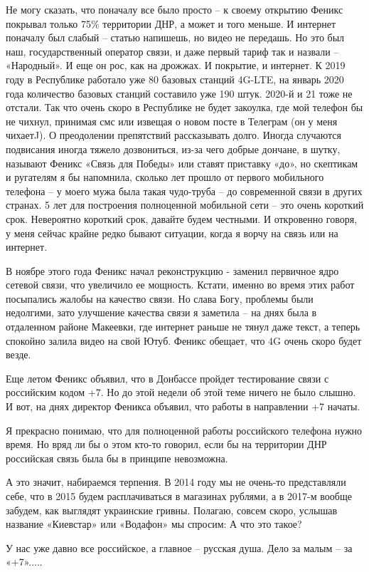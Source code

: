 Не могу сказать, что поначалу все было просто – к своему открытию Феникс
покрывал только 75\% территории ДНР, а может и того меньше. И интернет поначалу
был слабый – статью напишешь, но видео не передашь. Но это был наш,
государственный оператор связи, и даже первый тариф так и назвали – «Народный».
И еще он рос, как на дрожжах. И покрытие, и интернет. К 2019 году в Республике
работало уже 80 базовых станций 4G-LTE, на январь 2020 года количество базовых
станций составило уже 190 штук. 2020-й и 21 тоже не отстали. Так что очень
скоро в Республике не будет закоулка, где мой телефон бы не чихнул, принимая
смс или извещая о новом посте в Телеграм (он у меня чихаетJ). О преодолении
препятствий рассказывать долго. Иногда случаются подвисания иногда тяжело
дозвониться, из-за чего добрые дончане, в шутку, называют Феникс «Связь для
Победы» или ставят приставку «до», но скептикам и ругателям я бы напомнила,
сколько лет прошло от первого мобильного телефона – у моего мужа была такая
чудо-труба – до современной связи в других странах. 5 лет для построения
полноценной мобильной сети – это очень короткий срок. Невероятно короткий срок,
давайте будем честными. И откровенно говоря, у меня сейчас крайне редко бывают
ситуации, когда я ворчу на связь или на интернет.


В ноябре этого года Феникс начал реконструкцию - заменил первичное ядро сетевой
связи, что увеличило ее мощность. Кстати, именно во время этих работ посыпались
жалобы на качество связи. Но слава Богу, проблемы были недолгими, зато
улучшение качества связи я заметила – на днях была в отдаленном районе
Макеевки, где интернет раньше не тянул даже текст, а теперь спокойно залила
видео на свой Ютуб. Феникс обещает, что 4G очень скоро будет везде.


Еще летом Феникс объявил, что в Донбассе пройдет тестирование связи с
российским кодом +7. Но до этой недели об этой теме ничего не было слышно. И
вот, на днях директор Феникса объявил, что работы в направлении +7 начаты.

Я прекрасно понимаю, что для полноценной работы российского телефона нужно
время. Но вряд ли бы о этом кто-то говорил, если бы на территории ДНР
российская связь была бы в принципе невозможна.

А это значит, набираемся терпения. В 2014 году мы не очень-то представляли
себе, что в 2015 будем расплачиваться в магазинах рублями, а в 2017-м вообще
забудем, как выглядят украинские гривны. Полагаю, совсем скоро, услышав
название «Киевстар» или «Водафон» мы спросим: А что это такое?

У нас уже давно все российское, а главное – русская душа. Дело за малым – за
«+7».....
